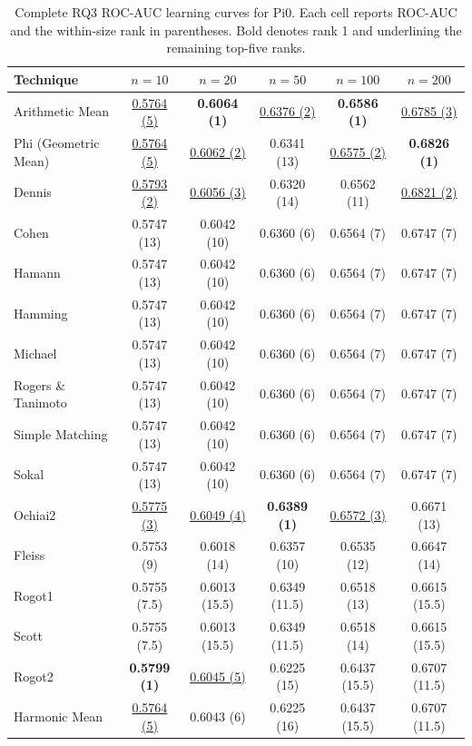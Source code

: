 \begin{table}[t]
\centering
\caption{Complete RQ3 ROC-AUC learning curves for Pi0. Each cell reports ROC-AUC and the within-size rank in parentheses. Bold denotes rank 1 and underlining the remaining top-five ranks.}
\label{tab:rq3v2-learning-curves-pi0}
{\scriptsize
\setlength{\tabcolsep}{5pt}
\begin{tabular}{lccccc}
\toprule
Technique & $n=10$ & $n=20$ & $n=50$ & $n=100$ & $n=200$ \\
\midrule
Arithmetic Mean & \underline{0.5764 (5)} & \textbf{0.6064 (1)} & \underline{0.6376 (2)} & \textbf{0.6586 (1)} & \underline{0.6785 (3)} \\
Phi (Geometric Mean) & \underline{0.5764 (5)} & \underline{0.6062 (2)} & 0.6341 (13) & \underline{0.6575 (2)} & \textbf{0.6826 (1)} \\
Dennis & \underline{0.5793 (2)} & \underline{0.6056 (3)} & 0.6320 (14) & 0.6562 (11) & \underline{0.6821 (2)} \\
Cohen & 0.5747 (13) & 0.6042 (10) & 0.6360 (6) & 0.6564 (7) & 0.6747 (7) \\
Hamann & 0.5747 (13) & 0.6042 (10) & 0.6360 (6) & 0.6564 (7) & 0.6747 (7) \\
Hamming & 0.5747 (13) & 0.6042 (10) & 0.6360 (6) & 0.6564 (7) & 0.6747 (7) \\
Michael & 0.5747 (13) & 0.6042 (10) & 0.6360 (6) & 0.6564 (7) & 0.6747 (7) \\
Rogers \& Tanimoto & 0.5747 (13) & 0.6042 (10) & 0.6360 (6) & 0.6564 (7) & 0.6747 (7) \\
Simple Matching & 0.5747 (13) & 0.6042 (10) & 0.6360 (6) & 0.6564 (7) & 0.6747 (7) \\
Sokal & 0.5747 (13) & 0.6042 (10) & 0.6360 (6) & 0.6564 (7) & 0.6747 (7) \\
Ochiai2 & \underline{0.5775 (3)} & \underline{0.6049 (4)} & \textbf{0.6389 (1)} & \underline{0.6572 (3)} & 0.6671 (13) \\
Fleiss & 0.5753 (9) & 0.6018 (14) & 0.6357 (10) & 0.6535 (12) & 0.6647 (14) \\
Rogot1 & 0.5755 (7.5) & 0.6013 (15.5) & 0.6349 (11.5) & 0.6518 (13) & 0.6615 (15.5) \\
Scott & 0.5755 (7.5) & 0.6013 (15.5) & 0.6349 (11.5) & 0.6518 (14) & 0.6615 (15.5) \\
Rogot2 & \textbf{0.5799 (1)} & \underline{0.6045 (5)} & 0.6225 (15) & 0.6437 (15.5) & 0.6707 (11.5) \\
Harmonic Mean & \underline{0.5764 (5)} & 0.6043 (6) & 0.6225 (16) & 0.6437 (15.5) & 0.6707 (11.5) \\

\end{tabular}}
\end{table}
